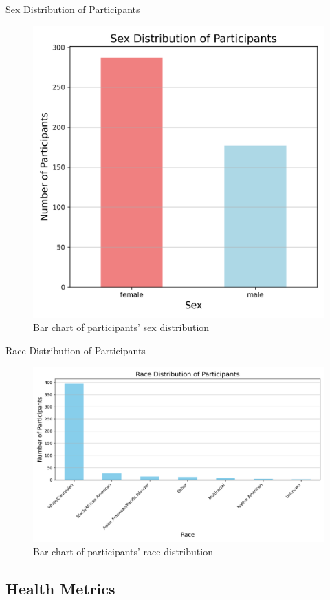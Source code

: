 \documentclass{beamer}
\begin{document}
\begin{frame}{Sex Distribution of Participants}
  \begin{figure}
    \centering
    \includegraphics[width=0.6\linewidth]{sex_distribution.png}
    \caption{Bar chart of participants' sex distribution}
  \end{figure}
\end{frame}

\begin{frame}{Race Distribution of Participants}
  \begin{figure}
    \centering
    \includegraphics[width=0.8\linewidth]{race_distribution.png}
    \caption{Bar chart of participants' race distribution}
  \end{figure}
\end{frame}

\subsection{Health Metrics}
\end{document}
